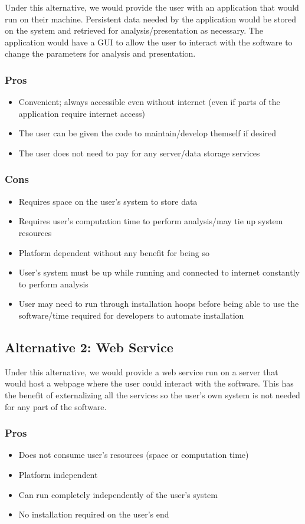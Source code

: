 \documentclass[12pt,a4paper]{article}
\begin{document}
Under this alternative, we would provide the user with an application that would run on their machine. Persistent data needed by the application would be stored on the system and retrieved for analysis/presentation as necessary. The application would have a GUI to allow the user to interact with the software to change the parameters for analysis and presentation.

\subsubsection{Pros}
\begin{itemize}
\item Convenient; always accessible even without internet (even if parts of the application require internet access)
\item The user can be given the code to maintain/develop themself if desired
\item The user does not need to pay for any server/data storage services
\end{itemize}
\subsubsection{Cons}
\begin{itemize}
\item Requires space on the user's system to store data
\item Requires user's computation time to perform analysis/may tie up system resources
\item Platform dependent without any benefit for being so
\item User's system must be up while running and connected to internet constantly to perform analysis
\item User may need to run through installation hoops before being able to use the software/time required for developers to automate installation
\end{itemize}
\newpage
\subsection{Alternative 2: Web Service}

Under this alternative, we would provide a web service run on a server that would host a webpage where the user could interact with the software. This has the benefit of externalizing all the services so the user's own system is not needed for any part of the software. 

\subsubsection{Pros}
\begin{itemize}
\item Does not consume user's resources (space or computation time)
\item Platform independent
\item Can run completely independently of the user's system
\item No installation required on the user's end
\end{itemize}
\end{document}
